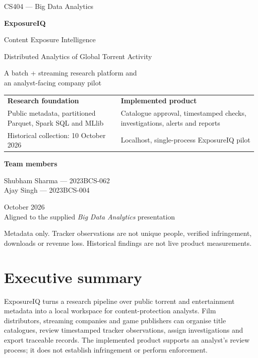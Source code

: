 \documentclass[11pt,a4paper]{article}
\begin{document}
\begin{titlepage}
\color{navy}
{\large CS404 --- Big Data Analytics\par}
\vspace{25mm}
{\Huge\bfseries ExposureIQ\par}
\vspace{4mm}
{\LARGE Content Exposure Intelligence\par}
\vspace{10mm}
{\Large Distributed Analytics of Global Torrent Activity\par}
\vspace{4mm}
{\large A batch + streaming research platform and\\
an analyst-facing company pilot\par}
\vspace{18mm}
\begin{tabularx}{\linewidth}{@{}YY@{}}
\toprule
\textbf{Research foundation} & \textbf{Implemented product}\\
Public metadata, partitioned Parquet, Spark SQL and MLlib &
Catalogue approval, timestamped checks, investigations, alerts and reports\\
Historical collection: 10 October 2026 &
Localhost, single-process ExposureIQ pilot\\
\bottomrule
\end{tabularx}
\vfill
{\large\textbf{Team members}\par}
Shubham Sharma --- 2023BCS-062\\
Ajay Singh --- 2023BCS-004
\vspace{10mm}

October 2026\\
Aligned to the supplied \textit{Big Data Analytics} presentation
\vspace{8mm}

{\small Metadata only. Tracker observations are not unique people, verified
infringement, downloads or revenue loss. Historical findings are not live
product measurements.}
\end{titlepage}

\section*{Executive summary}
ExposureIQ turns a research pipeline over public torrent and entertainment
metadata into a local workspace for content-protection analysts. Film
distributors, streaming companies and game publishers can organise title
catalogues, review timestamped tracker observations, assign investigations
and export traceable records. The implemented product supports an analyst's
review process; it does not establish infringement or perform enforcement.
\end{document}
